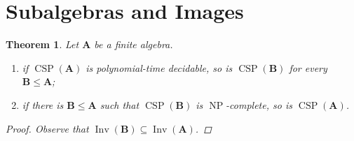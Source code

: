 \documentclass{amsart}
\theoremstyle{plain}
\newtheorem{theorem}{Theorem}[section]
\theoremstyle{definition}
\theoremstyle{remark}
\DeclareMathOperator{\CSP}{CSP}
\DeclareMathOperator{\Inv}{Inv}
\DeclareMathOperator{\NP}{NP}
\begin{document}
\section{Subalgebras and Images}
\begin{theorem}
    \label{sub}
    Let $\mathbf{A}$ be a finite algebra. 
    \begin{enumerate}
        \item if $\CSP(\mathbf{A})$ is polynomial-time decidable, so is $\CSP(\mathbf{B})$ for every $\mathbf{B} \le \mathbf{A}$; 
        \item if there is $\mathbf{B} \le \mathbf{A}$ such that $\CSP(\mathbf{B})$ is $\NP$-complete, so is $\CSP(\mathbf{A})$. 
    \end{enumerate}
    \begin{proof}
        Observe that $\Inv(\mathbf{B}) \subseteq \Inv(\mathbf{A})$.
    \end{proof}
\end{theorem}
\end{document}
